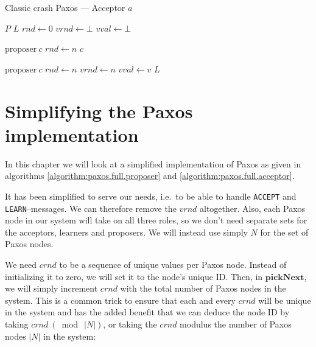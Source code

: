 \begin{algorithm}
  \caption{Classic crash Paxos --- Acceptor $a$}
  \label{algorithm:paxos.full.acceptor}
  \begin{algorithmic}
    \State $P$ 
    \State $L$ 
    \State $rnd \gets 0$ 
    \State $vrnd \gets \bot$ 
    \State $vval \gets \bot$ 
    \State

       {$\text{proposer}\ c$} 
         \State $rnd \gets n$
         \State {}
                       {$c$}
      \EndIf
    \EndOn
    \State

       {$\text{proposer}\ c$} 
        \State $rnd \gets n$
        \State $vrnd \gets n$
        \State $vval \gets v$
        \State {}
                      {$L$}
      \EndIf
    \EndOn
  \end{algorithmic}
\end{algorithm}


\section{Simplifying the Paxos implementation}

In this chapter we will look at a simplified implementation of Paxos as
given in algorithms \ref{algorithm:paxos.full.proposer} and
\ref{algorithm:paxos.full.acceptor}.

It has been simplified to serve our needs, i.e.~to be able to handle
\texttt{ACCEPT} and \texttt{LEARN}--messages.  We can therefore remove the
$vrnd$ altogether.  Also, each Paxos node in our system will take on all
three roles, so we don't need separate sets for the acceptors, learners and
proposers. We will instead use simply $N$ for the set of Paxos nodes.

We need $crnd$ to be a sequence of unique values per Paxos node.
Instead of initializing it to zero, we will set it to the node's
unique ID.  Then, in $\textbf{pickNext}$, we will simply increment $crnd$
with the total number of Paxos nodes in the system.  This is a common trick
to ensure that each and every $crnd$ will be unique in the system and has
the added benefit that we can deduce the node ID by taking
$crnd\ (\bmod\ |N|)$, or taking the $crnd$ modulus the number of Paxos nodes
$|N|$ in the system:

